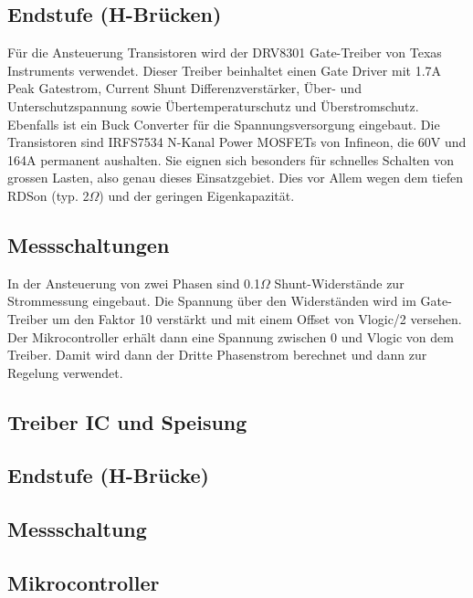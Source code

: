 \subsection*{Endstufe (H-Brücken)}
Für die Ansteuerung Transistoren wird der DRV8301 Gate-Treiber von Texas Instruments verwendet. Dieser Treiber beinhaltet einen Gate Driver mit 1.7A Peak Gatestrom, Current Shunt Differenzverstärker, Über- und Unterschutzspannung sowie Übertemperaturschutz und Überstromschutz. Ebenfalls ist ein Buck Converter für die Spannungsversorgung eingebaut.
Die Transistoren sind IRFS7534 N-Kanal Power MOSFETs von Infineon, die 60V und 164A permanent aushalten. Sie eignen sich besonders für schnelles Schalten von grossen Lasten, also genau dieses Einsatzgebiet. Dies vor Allem wegen dem tiefen RDSon (typ. 2\(\Omega\)) und der geringen Eigenkapazität. 

\subsection*{Messschaltungen}
In der Ansteuerung von zwei Phasen sind 0.1\(\Omega\) Shunt-Widerstände zur Strommessung eingebaut. Die Spannung über den Widerständen wird im Gate-Treiber um den Faktor 10 verstärkt und mit einem Offset von Vlogic/2 versehen. Der Mikrocontroller erhält dann eine Spannung zwischen 0 und Vlogic von dem Treiber. Damit wird dann der Dritte Phasenstrom berechnet und dann zur Regelung verwendet.


\subsection*{Treiber IC und Speisung}
\subsection*{Endstufe (H-Brücke)}
\subsection*{Messschaltung}
\subsection*{Mikrocontroller}

